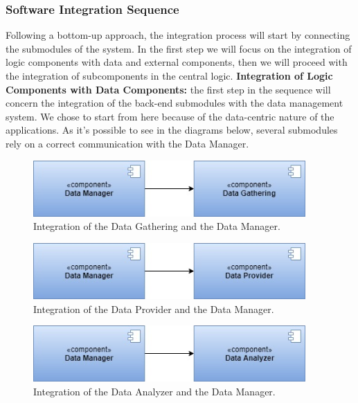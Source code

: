 \subsubsection{Software Integration Sequence}
Following a bottom-up approach, the integration process will start by connecting the submodules of the system.
In the first step we will focus on the integration of logic components with data and external components, then we will proceed with the integration of subcomponents in the central logic.
\clearpage
\noindent\textbf{Integration of Logic Components with Data Components:}
the first step in the sequence will concern the integration of the back-end submodules with the data management system. We chose to start from here because of the data-centric nature of the applications. As it's possible to see in the diagrams below, several submodules rely on a correct communication with the Data Manager.

\begin{figure}[H]
    \centering
    \includegraphics[width=295pt]{images/IntegrationSequence/TrackMe-Integration_sequence2.jpg}
    \caption{Integration of the Data Gathering and the Data Manager.}
\end{figure}
\begin{figure}[H]
    \centering
    \includegraphics[width=295pt]{images/IntegrationSequence/TrackMe-Integration_sequence1.jpg}
    \caption{Integration of the Data Provider and the Data Manager.}
\end{figure}
\begin{figure}[H]
    \centering
    \includegraphics[width=295pt]{images/IntegrationSequence/TrackMe-Integration_sequence7.jpg}
    \caption{Integration of the Data Analyzer and the Data Manager.}
\end{figure}

